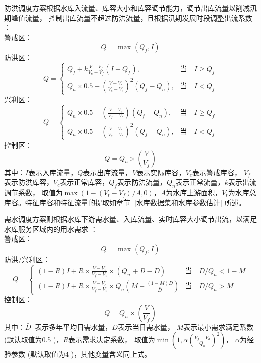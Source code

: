 防洪调度方案根据水库入流量、库容大小和库容调节能力，调节出库流量以削减汛期峰值流量，
控制出库流量不超过防洪流量，且根据汛期发展时段调整出流系数 \citep{hanazaki2022development}：\\
警戒区：
\begin{equation}
Q=\max \left(Q_{f}, I\right)
\end{equation}
防洪区：
\begin{equation}
Q=\begin{cases}
Q_{f}+k \frac{V-V_{f}}{V_{e}-V_{f}}\left(I-Q_{f}\right), & \text{当}\quad I \geq Q_{f} \\
Q_{n} \times 0.5+\left(\frac{V-V_{c}}{V_{e}-V_{c}}\right)^{2}\left(Q_{f}-Q_{n}\right), & \text{当}\quad I<Q_{f}
  \end{cases}
\end{equation}
兴利区：
\begin{equation}
Q=\begin{cases}
Q_{n} \times 0.5+\left(\frac{V-V_{c}}{V_{f}-V_{c}}\right)\left(Q_{f}-Q_{n}\right), & \text{当}\quad I \geq Q_{f} \\
Q_{n} \times 0.5+\left(\frac{V-V_{c}}{V_{e}-V_{c}}\right)^{2}\left(Q_{f}-Q_{n}\right), & \text{当}\quad I<Q_{f}
  \end{cases}
\end{equation}
控制区：
\begin{equation}
Q=Q_{n} \times\left(\frac{V}{V_{f}}\right)
\end{equation}
其中：$I$表示入库流量，$Q$表示出库流量，$V$表示实际库容，$V_e$表示警戒库容，
$V_f$表示防洪库容，$V_c$表示正常库容，$Q_f$表示防洪流量，$Q_n$表示正常流量，$k$表示出流调节系数，
取值为$\max(1-(V_t-V_f)/A,0)$，$A$为水库上游面积，$V_t$为水库总库容。特征库容和特征流量的提取如章节~\ref{水库数据集和水库参数估计} 所述。


需水调度方案则根据水库下游需水量、入库流量、实时库容大小调节出流，以满足水库服务区域内的用水需求 \citep{hanasaki2006reservoir,shin2019high}：\\
警戒区：
\begin{equation}
Q=\max \left(Q_{f}, I\right)
\end{equation}
防洪/兴利区：
\begin{equation}
Q=\begin{cases}
  (1-R) I+R \times \frac{V-V_{c}}{V_{f}-V_{c}} \times\left(Q_{n}+D-\bar{D}\right) & \text{当}\quad
    \bar{D} / Q_{n}<1-M \\ 
  (1-R) I+R \times \frac{V-V_{c}}{V_{f}-V_{c}} \times Q_{n}\left(M+\frac{(1-M) D}{\bar{D}}\right)      &  \text{当}\quad \bar{D} / Q_{n}>M
    \end{cases}
\end{equation}
控制区：
\begin{equation}
Q=Q_{n} \times\left(\frac{V}{V_{f}}\right)
\end{equation}
其中：$\bar{D}̅$表示多年平均日需水量，$D$表示当日需水量，
$M$表示最小需求满足系数 (默认取值为0.5 \citep{hanasaki2006reservoir})，$R$表示需求决定系数，
取值为$\min \left(1, \alpha\left(\frac{V_{f}-V_{d}}{Q_{n}}\right)^{2}\right)$，
$\alpha$为经验参数 (默认取值为4 \citep{hanasaki2006reservoir})，其他变量含义同上式。


